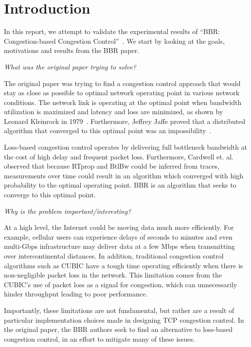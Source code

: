 
\section{Introduction}
In this report, we attempt to validate the experimental results of ``BBR:
Congestion-based Congestion Control''~\cite{cardwell2016bbr}. We start
by looking at the goals, motivations and results from the BBR paper.

\emph{What was the original paper trying to solve?}

The original paper was trying to find a congestion control approach
that would stay as close as possible to optimal network operating point
in various network conditions. The network link is operating at the optimal
point when bandwidth utilization is maximized and latency and loss are
minimized, as shown by Leonard Kleinrock in 1979~\cite{kleinrock1979power}.
Furthermore, Jeffrey Jaffe proved that a distributed algorithm that converged
to this optimal point was an impossibility~\cite{jaffe1981flow}.

Loss-based congestion control operates by delivering full
bottleneck bandwidth at the cost of high delay and frequent packet loss.
Furthermore, Cardwell et. al. observed that because RTprop and BtlBw could
be inferred from traces, measurements over time could result in an
algorithm which converged with high probability to the optimal operating point.
BBR is an algorithm that seeks to converge to this optimal point.


\emph{Why is the problem important/interesting?}

At a high level, the Internet could be moving data much more efficiently.
For example, cellular users can experience delays of seconds to minutes and
even multi-Gbps infrastructure may deliver data at a few Mbps when transmitting
over intercontinental distances. In addition, traditional congestion control
algorithms such as CUBIC have a tough time operating efficiently when there
is non-negligible packet loss in the network. This limitation comes from the
CUBIC's use of packet loss as a signal for congestion, which can unnecessarily
hinder throughput leading to poor performance.

Importantly, these limitations are not fundamental, but rather are a result
of particular implementation choices made in designing TCP congestion control.
In the original paper, the BBR authors seek to find an alternative to loss-based
congestion control, in an effort to mitigate many of these issues.

